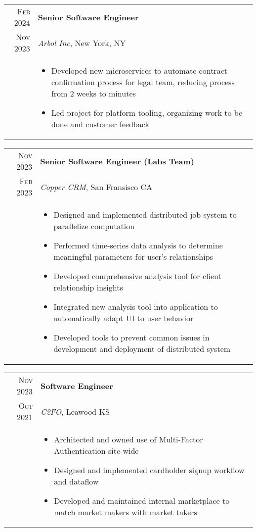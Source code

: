 \documentclass[a4paper,10pt]{article}
\begin{document}
\begin{tabular}{r|p{15cm}}
  \textsc{Feb 2024}  & \textbf{Senior Software Engineer} \\
  \textsc{Nov 2023} & \textit{Arbol Inc}, New York, NY
  \\ &  
       \begin{itemize}
       \item Developed new microservices to automate contract confirmation process for legal team, reducing
             process from 2 weeks to minutes
       \item Led project for platform tooling, organizing work to be done and customer feedback
       \end{itemize} \\
\end{tabular}

\begin{tabular}{r|p{15cm}}
  \textsc{Nov 2023}  & \textbf{Senior Software Engineer (Labs Team)} \\
  \textsc{Feb 2023} & \textit{Copper CRM}, San Fransisco CA
  \\ &  
       \begin{itemize}
       \item Designed and implemented distributed job system to parallelize computation
       \item Performed time-series data analysis to determine meaningful parameters for user’s relationships
       \item Developed comprehensive analysis tool for client relationship insights
       \item Integrated new analysis tool into application to automatically adapt UI to user behavior
       \item Developed tools to prevent common issues in development and deployment of distributed system
       \end{itemize} \\
\end{tabular}

\begin{tabular}{r|p{15cm}}
  \textsc{Nov 2023} & \textbf{Software Engineer} \\
  \textsc{Oct 2021} & \textit{C2FO}, Leawood KS
  \\ &  
       \begin{itemize}
       \item Architected and owned use of Multi-Factor Authentication site-wide
       \item Designed and implemented cardholder signup workflow and dataflow
       \item Developed and maintained internal marketplace to match market makers with market takers
       \end{itemize} \\
\end{tabular}
\end{document}
